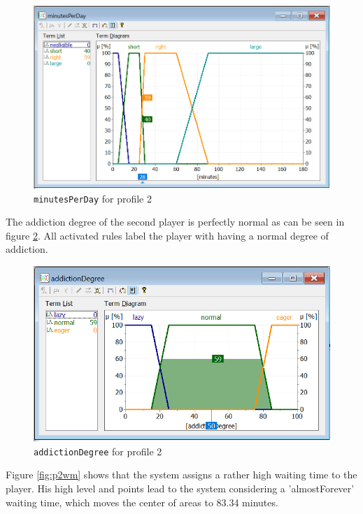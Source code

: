\begin{figure}[H]
\centering
\includegraphics[width=\textwidth]{img/profile2_vMinutesPerDay}
\caption{\texttt{minutesPerDay} for profile 2}
\label{fig:p2mpd} 
\end{figure}

The addiction degree of the second player is perfectly normal as can be seen in figure \ref{fig:p2ad}. All activated rules label the player with having a normal degree of addiction.

\begin{figure}[H]
\centering
\includegraphics[width=\textwidth]{img/profile2_vAddictionDegree}
\caption{\texttt{addictionDegree} for profile 2}
\label{fig:p2ad} 
\end{figure}

Figure \ref{fig:p2wm} shows that the system assigns a rather high waiting time to the player. His high level and points lead to the system considering a 'almostForever' waiting time, which moves the center of areas to 83.34 minutes.

